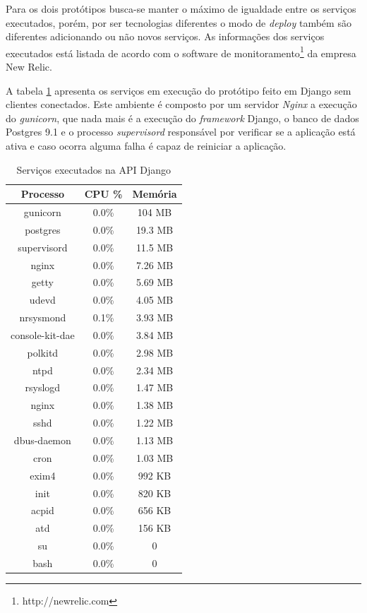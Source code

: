   Para os dois protótipos busca-se manter o máximo de igualdade entre os serviços executados, porém, por ser 
  tecnologias diferentes o modo de \textit{deploy} também são diferentes adicionando ou não novos serviços. 
  As informações dos serviços executados está listada de acordo com o software de monitoramento\footnote{http://newrelic.com}
  da empresa New Relic.
  
  A tabela \ref{tab:services-in-api-django} apresenta os serviços em execução do protótipo feito em Django sem clientes conectados.
  Este ambiente é composto por um servidor \textit{Nginx} a execução do \textit{gunicorn},
  que nada mais é a execução do \textit{framework} Django, o banco de dados Postgres 9.1 e o processo \textit{supervisord} responsável por
  verificar se a aplicação está ativa e caso ocorra alguma falha é capaz de reiniciar a aplicação.
  
  \begin{table}[H]
    \centering
    \footnotesize
    \setlength{\abovecaptionskip}{0pt}
    \setlength{\belowcaptionskip}{0pt}
    \caption[Serviços executados na API Django]{Serviços executados na API Django}
    \label{tab:services-in-api-django}
    \begin{tabular}{c|c|c}
      \hline \hline
      Processo  & 	CPU \% &	Memória \\
      \hline \hline
      gunicorn &	0.0\% &		104 MB \\
      postgres &	0.0\% &		19.3 MB \\
      supervisord &	0.0\% &		11.5 MB \\
      nginx &		0.0\% &		7.26 MB \\
      getty &		0.0\% &		5.69 MB \\
      udevd &		0.0\% &		4.05 MB \\
      nrsysmond &	0.1\% &		3.93 MB \\
      console-kit-dae &	0.0\% &		3.84 MB \\
      polkitd &	 	0.0\% &		2.98 MB \\
      ntpd &		0.0\% &		2.34 MB \\
      rsyslogd &	0.0\% &		1.47 MB \\
      nginx &		0.0\% &		1.38 MB \\
      sshd &		0.0\% &		1.22 MB \\
      dbus-daemon &	0.0\% &		1.13 MB \\
      cron &		0.0\% &		1.03 MB \\
      exim4 &		0.0\% &		992 KB \\
      init &		0.0\% &		820 KB \\
      acpid &		0.0\% &		656 KB \\
      atd &		0.0\% &		156 KB \\
      su &		0.0\% &		0 \\
      bash &		0.0\% &		0 \\
      \hline \hline
    \end{tabular}
  \end{table}
  
